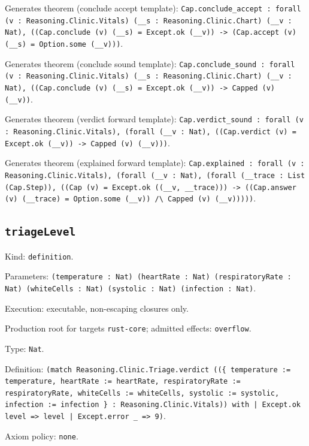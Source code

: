 \documentclass[11pt]{article}
\begin{document}
\noindent Generates theorem (conclude accept template): \texttt{Cap.conclude\_accept : forall (v : Reasoning.Clinic.Vitals) (\_\_s : Reasoning.Clinic.Chart) (\_\_v : Nat), ((Cap.conclude (v) (\_\_s) = Except.ok (\_\_v)) -> (Cap.accept (v) (\_\_s) = Option.some (\_\_v)))}.\par
\noindent Generates theorem (conclude sound template): \texttt{Cap.conclude\_sound : forall (v : Reasoning.Clinic.Vitals) (\_\_s : Reasoning.Clinic.Chart) (\_\_v : Nat), ((Cap.conclude (v) (\_\_s) = Except.ok (\_\_v)) -> Capped (v) (\_\_v))}.\par
\noindent Generates theorem (verdict forward template): \texttt{Cap.verdict\_sound : forall (v : Reasoning.Clinic.Vitals), (forall (\_\_v : Nat), ((Cap.verdict (v) = Except.ok (\_\_v)) -> Capped (v) (\_\_v)))}.\par
\noindent Generates theorem (explained forward template): \texttt{Cap.explained : forall (v : Reasoning.Clinic.Vitals), (forall (\_\_v : Nat), (forall (\_\_trace : List (Cap.Step)), ((Cap (v) = Except.ok ((\_\_v, \_\_trace))) -> ((Cap.answer (v) (\_\_trace) = Option.some (\_\_v)) /\textbackslash{} Capped (v) (\_\_v)))))}.\par
\subsection*{\texttt{triageLevel}}
\noindent Kind: \texttt{definition}.\par
\noindent Parameters: \texttt{(temperature : Nat) (heartRate : Nat) (respiratoryRate : Nat) (whiteCells : Nat) (systolic : Nat) (infection : Nat)}.\par
\noindent Execution: executable, non-escaping closures only.\par
\noindent Production root for targets \texttt{rust-core}; admitted effects: \texttt{overflow}.\par
\noindent Type: \texttt{Nat}.\par
\noindent Definition: \texttt{(match Reasoning.Clinic.Triage.verdict ((\{ temperature := temperature, heartRate := heartRate, respiratoryRate := respiratoryRate, whiteCells := whiteCells, systolic := systolic, infection := infection \} : Reasoning.Clinic.Vitals)) with | Except.ok level => level | Except.error \_ => 9)}.\par
\noindent Axiom policy: \texttt{none}.\par
\end{document}
